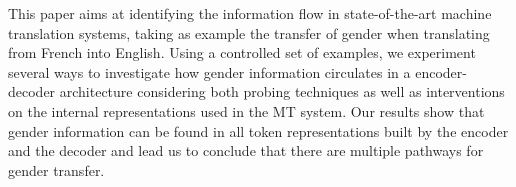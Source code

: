 This paper aims at identifying the information flow in state-of-the-art machine translation systems, taking as example the transfer of gender when translating from French into English.   Using a controlled set of examples, we experiment several ways to investigate how gender information circulates in a encoder-decoder architecture considering both probing techniques as well as interventions on the internal representations used in the MT system. Our  results show that gender information can be found in all token representations built by the encoder and the decoder and lead us to conclude that there are multiple pathways for gender transfer.

